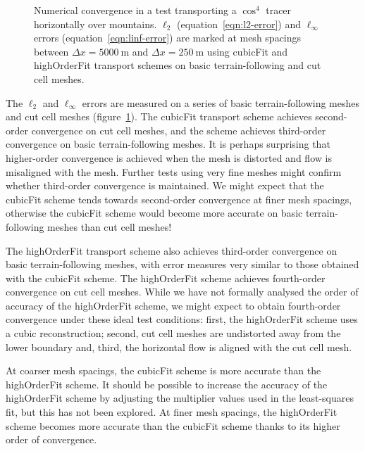\begin{figure}
	\centering
	
	\caption{Numerical convergence in a test transporting a $\cos^4$ tracer horizontally over mountains.
	$\ell_2$ (equation~\ref{eqn:l2-error}) and $\ell_\infty$ errors (equation~\ref{eqn:linf-error}) are marked at mesh spacings between $\Delta x = \SI{5000}{\meter}$ and $\Delta x = \SI{250}{\meter}$ using cubicFit and highOrderFit transport schemes on basic terrain-following and cut cell meshes.}
	\label{fig:highOrderFit:schaerAdvectSmooth:convergence}
\end{figure}

The $\ell_2$ and $\ell_\infty$ errors are measured on a series of basic terrain-following meshes and cut cell meshes (figure~\ref{fig:highOrderFit:schaerAdvectSmooth:convergence}).
The cubicFit transport scheme achieves second-order convergence on cut cell meshes, and the scheme achieves third-order convergence on basic terrain-following meshes.
It is perhaps surprising that higher-order convergence is achieved when the mesh is distorted and flow is misaligned with the mesh.
Further tests using very fine meshes might confirm whether third-order convergence is maintained.
We might expect that the cubicFit scheme tends towards second-order convergence at finer mesh spacings, otherwise the cubicFit scheme would become more accurate on basic terrain-following meshes than cut cell meshes!

The highOrderFit transport scheme also achieves third-order convergence on basic terrain-following meshes, with error measures very similar to those obtained with the cubicFit scheme.
The highOrderFit scheme achieves fourth-order convergence on cut cell meshes.
While we have not formally analysed the order of accuracy of the highOrderFit scheme, we might expect to obtain fourth-order convergence under these ideal test conditions: first, the highOrderFit scheme uses a cubic reconstruction; second, cut cell meshes are undistorted away from the lower boundary and, third, the horizontal flow is aligned with the cut cell mesh.

At coarser mesh spacings, the cubicFit scheme is more accurate than the highOrderFit scheme.
It should be possible to increase the accuracy of the highOrderFit scheme by adjusting the multiplier values used in the least-squares fit, but this has not been explored.
At finer mesh spacings, the highOrderFit scheme becomes more accurate than the cubicFit scheme thanks to its higher order of convergence.

